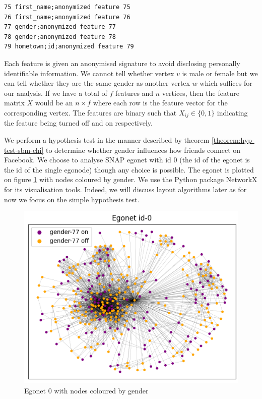 \documentclass[11pt]{article}
\newcommand{\figwidth}{0.7\linewidth}
\begin{document}
\begin{multicols*}{2}
\begin{center}
\begin{minipage}{8cm}
\begin{Verbatim}[fontsize=\small, frame=single, label={\fbox{Example anonymised feature flags}}]
75 first_name;anonymized feature 75
76 first_name;anonymized feature 76
77 gender;anonymized feature 77
78 gender;anonymized feature 78
79 hometown;id;anonymized feature 79
\end{Verbatim}
\end{minipage}
\end{center}


Each feature is given an anonymised signature to avoid disclosing personally identifiable information. We cannot tell whether vertex $v$ is male or female but we can tell whether they are the same gender as another vertex $w$ which suffices for our analysis. If we have a total of $f$ features and $n$ vertices, then the feature matrix $X$ would be an $n \times f$ where each row is the feature vector for the corresponding vertex. The features are binary such that $X_{ij} \in \{0, 1\}$ indicating the feature being turned off and on respectively.

We perform a hypothesis test in the manner described by theorem \ref{theorem:hyp-test-sbm-chi} to determine whether gender influences how friends connect on Facebook. We choose to analyse SNAP egonet with id 0 (the id of the egonet is the id of the single egonode) though any choice is possible. The egonet is plotted on figure \ref{fig:ego-0-by-gender} with nodes coloured by gender. We use the Python package NetworkX \cite{networkx} for its visualisation tools. Indeed, we will discuss layout algorithms later as for now we focus on the simple hypothesis test.
%
\begin{figure}[H]
	\centering
	\includegraphics[width=\figwidth]{ego-0-by-gender.png}
	\caption{Egonet 0 with nodes coloured by gender}
	\label{fig:ego-0-by-gender}
\end{figure}


\end{multicols*}
\end{document}
